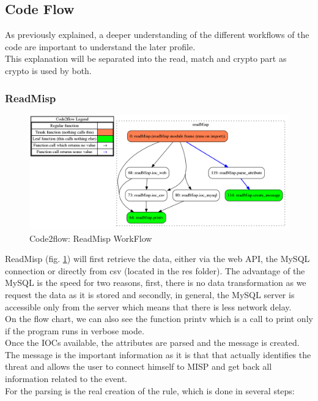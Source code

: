 \documentclass{eplmastersthesis}
\begin{document}
\subsection{Code Flow}
As previously explained, a deeper understanding of the different workflows of the code are important to understand the later profile.\\
This explanation will be separated into the read, match and crypto part as crypto is used by both.

\subsubsection{ReadMisp}
\begin{figure}[h!]
\begin{center}
	\includegraphics[scale=0.3]{res/flowReadMisp}
	\caption{Code2flow: ReadMisp WorkFlow}
	\label{code2flow-readMisp}
\end{center}
\end{figure}

ReadMisp (fig. \ref{code2flow-readMisp}) will first retrieve the data, either via the web API, the MySQL connection or directly from csv (located in the res folder). The advantage of the MySQL is the speed for two reasons, first, there is no data transformation as we request the data as it is stored and secondly, in general, the MySQL server is accessible only from the server which means that there is less network delay.\\
On the flow chart, we can also see the function printv which is a call to print only if the program runs in verbose mode.\\
Once the IOCs available, the attributes are parsed and the message is created. The message is the important information as it is that that actually identifies the threat and allows the user to connect himself to MISP and get back all information related to the event.\\
For the parsing is the real creation of the rule, which is done in several steps:
\end{document}
